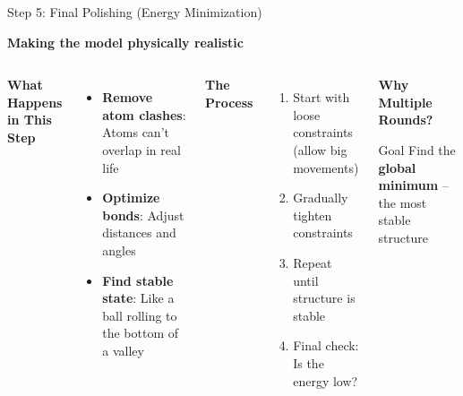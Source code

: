 \documentclass[aspectratio=169,xcolor=table]{beamer}
\begin{document}
\begin{frame}{Step 5: Final Polishing (Energy Minimization)}

\textbf{Making the model physically realistic}

\vspace{0.3cm}

\begin{columns}
\textbf{What Happens in This Step}
\begin{itemize}
    \item \textbf{Remove atom clashes}: Atoms can't overlap in real life
    \item \textbf{Optimize bonds}: Adjust distances and angles
    \item \textbf{Find stable state}: Like a ball rolling to the bottom of a valley
\end{itemize}

\vspace{0.3cm}

\textbf{The Process}
\begin{enumerate}
    \item Start with loose constraints (allow big movements)
    \item Gradually tighten constraints
    \item Repeat until structure is stable
    \item Final check: Is the energy low?
\end{enumerate}

\begin{center}
\textbf{Why Multiple Rounds?}
\vspace{0.2cm}


\vspace{0.3cm}

\begin{block}{Goal}
Find the \textbf{global minimum} -- the most stable structure
\end{block}
\end{center}
\end{columns}

\end{frame}
\end{document}
